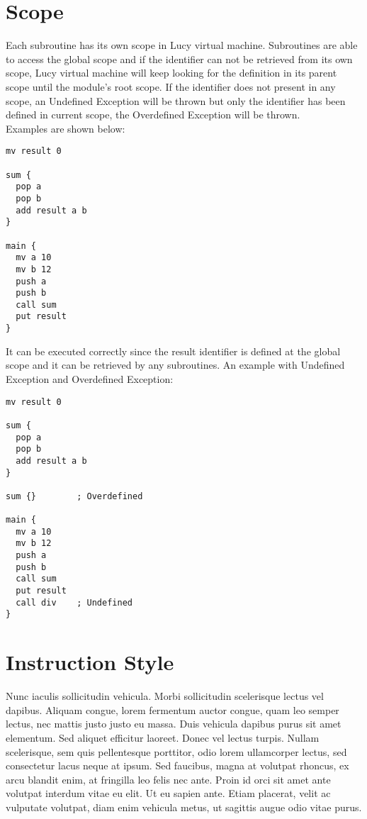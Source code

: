 \section{Scope}
Each subroutine has its own scope in Lucy virtual machine. Subroutines are able to access the global scope and if the identifier can not be retrieved from its own scope, Lucy virtual machine will keep looking for the definition in its parent scope until the module’s root scope. If the identifier does not present in any scope, an Undefined Exception will be thrown but only the identifier has been defined in current scope, the Overdefined Exception will be thrown. \\
Examples are shown below:
\begin{lstlisting}[language=LucyX]
mv result 0

sum {
  pop a
  pop b
  add result a b
}

main {
  mv a 10
  mv b 12
  push a
  push b
  call sum
  put result
}
\end{lstlisting}
It can be executed correctly since the result identifier is defined at the global scope and it can be retrieved by any subroutines.
An example with Undefined Exception and Overdefined Exception:
\begin{lstlisting}[language=LucyX]
mv result 0

sum {
  pop a
  pop b
  add result a b
}

sum {}        ; Overdefined

main {
  mv a 10
  mv b 12
  push a
  push b
  call sum
  put result
  call div    ; Undefined
}
\end{lstlisting}


\section{Instruction Style}
Nunc iaculis sollicitudin vehicula. Morbi sollicitudin scelerisque lectus vel dapibus. Aliquam congue, lorem fermentum auctor congue, quam leo semper lectus, nec mattis justo justo eu massa. Duis vehicula dapibus purus sit amet elementum. Sed aliquet efficitur laoreet. Donec vel lectus turpis. Nullam scelerisque, sem quis pellentesque porttitor, odio lorem ullamcorper lectus, sed consectetur lacus neque at ipsum. Sed faucibus, magna at volutpat rhoncus, ex arcu blandit enim, at fringilla leo felis nec ante. Proin id orci sit amet ante volutpat interdum vitae eu elit. Ut eu sapien ante. Etiam placerat, velit ac vulputate volutpat, diam enim vehicula metus, ut sagittis augue odio vitae purus.

